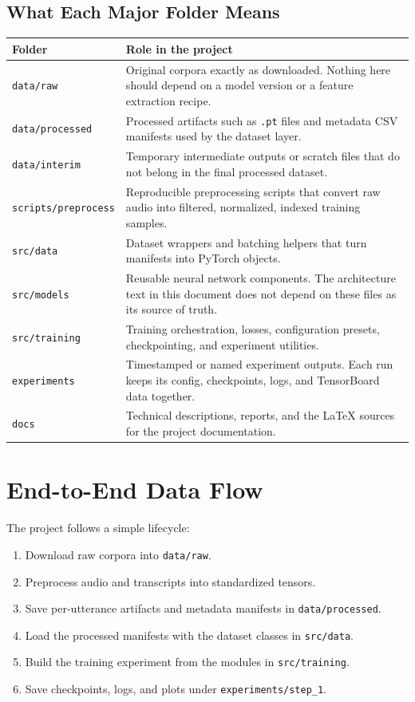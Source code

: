 \documentclass[11pt]{article}
\newcommand{\pathtt}[1]{\texttt{#1}}
\begin{document}
\subsection{What Each Major Folder Means}

\begin{longtable}{>{\raggedright\arraybackslash}p{} >{\raggedright\arraybackslash}p{}}
\toprule
\textbf{Folder} & \textbf{Role in the project} \\
\midrule
\pathtt{data/raw} & Original corpora exactly as downloaded. Nothing here should depend on a model version or a feature extraction recipe. \\
\pathtt{data/processed} & Processed artifacts such as \pathtt{.pt} files and metadata CSV manifests used by the dataset layer. \\
\pathtt{data/interim} & Temporary intermediate outputs or scratch files that do not belong in the final processed dataset. \\
\pathtt{scripts/preprocess} & Reproducible preprocessing scripts that convert raw audio into filtered, normalized, indexed training samples. \\
\pathtt{src/data} & Dataset wrappers and batching helpers that turn manifests into PyTorch objects. \\
\pathtt{src/models} & Reusable neural network components. The architecture text in this document does not depend on these files as its source of truth. \\
\pathtt{src/training} & Training orchestration, losses, configuration presets, checkpointing, and experiment utilities. \\
\pathtt{experiments} & Timestamped or named experiment outputs. Each run keeps its config, checkpoints, logs, and TensorBoard data together. \\
\pathtt{docs} & Technical descriptions, reports, and the LaTeX sources for the project documentation. \\
\bottomrule
\end{longtable}

\section{End-to-End Data Flow}

The project follows a simple lifecycle:

\begin{enumerate}[leftmargin=1.5em]
  \item Download raw corpora into \pathtt{data/raw}.
  \item Preprocess audio and transcripts into standardized tensors.
  \item Save per-utterance artifacts and metadata manifests in \pathtt{data/processed}.
  \item Load the processed manifests with the dataset classes in \pathtt{src/data}.
  \item Build the training experiment from the modules in \pathtt{src/training}.
  \item Save checkpoints, logs, and plots under \pathtt{experiments/step\_1}.
\end{enumerate}
\end{document}
